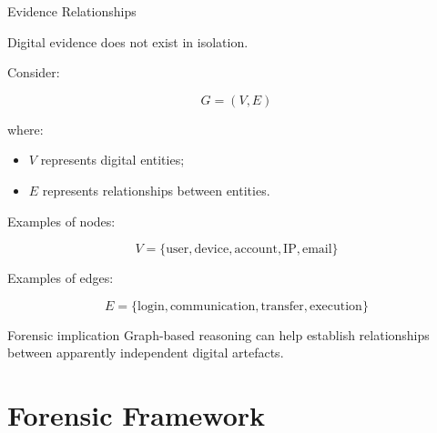 \documentclass[aspectratio=169,11pt]{beamer}
\begin{document}
	\begin{frame}{Evidence Relationships}
		
		Digital evidence does not exist in isolation.
		
		Consider:
		
		\[
		G=(V,E)
		\]
		
		where:
		
		\begin{itemize}
			\item $V$ represents digital entities;
			\item $E$ represents relationships between entities.
		\end{itemize}
		
		\vspace{0.3cm}
		
		Examples of nodes:
		
		\[
		V=
		\{
		\text{user},
		\text{device},
		\text{account},
		\text{IP},
		\text{email}
		\}
		\]
		
		\vspace{0.2cm}
		
		Examples of edges:
		
		\[
		E=
		\{
		\text{login},
		\text{communication},
		\text{transfer},
		\text{execution}
		\}
		\]
		
		\begin{block}{Forensic implication}
			Graph-based reasoning can help establish relationships between
			apparently independent digital artefacts.
		\end{block}
		
	\end{frame}
	
	
	\section{Forensic Framework}
	
	
\end{document}
